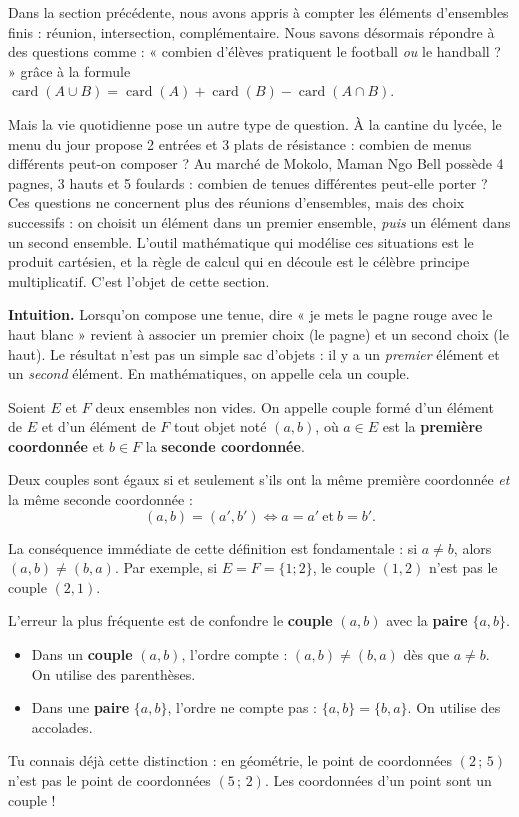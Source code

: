 \documentclass[11pt]{article}
\newcommand{\cle}[1]{{\popxbold\color{popdark}#1}}
\newcounter{popsec}
\newcounter{popsub}
\newcommand{\courssub}[1]{%
  \stepcounter{popsub}%
  \par\vspace{9pt}\noindent{\popxbold\fontsize{11.5}{13}\selectfont\color{popink}{\color{poporange}\thepopsec.\thepopsub}\hspace{6pt}#1}\par\nopagebreak\vspace{4pt}
}
\begin{document}
Dans la section précédente, nous avons appris à compter les éléments d'ensembles finis : réunion, intersection, complémentaire. Nous savons désormais répondre à des questions comme : « combien d'élèves pratiquent le football \emph{ou} le handball ? » grâce à la formule $\operatorname{card}(A\cup B)=\operatorname{card}(A)+\operatorname{card}(B)-\operatorname{card}(A\cap B)$.

Mais la vie quotidienne pose un autre type de question. À la cantine du lycée, le menu du jour propose 2 entrées et 3 plats de résistance : combien de menus différents peut-on composer ? Au marché de Mokolo, Maman Ngo Bell possède 4 pagnes, 3 hauts et 5 foulards : combien de tenues différentes peut-elle porter ? Ces questions ne concernent plus des réunions d'ensembles, mais des \cle{choix successifs} : on choisit un élément dans un premier ensemble, \emph{puis} un élément dans un second ensemble. L'outil mathématique qui modélise ces situations est le \cle{produit cartésien}, et la règle de calcul qui en découle est le célèbre \cle{principe multiplicatif}. C'est l'objet de cette section.

\courssub{Couple d'éléments : l'ordre compte}

\textbf{Intuition.} Lorsqu'on compose une tenue, dire « je mets le pagne rouge avec le haut blanc » revient à associer un premier choix (le pagne) et un second choix (le haut). Le résultat n'est pas un simple sac d'objets : il y a un \emph{premier} élément et un \emph{second} élément. En mathématiques, on appelle cela un \cle{couple}.

\begin{definition}
Soient $E$ et $F$ deux ensembles non vides. On appelle \cle{couple} formé d'un élément de $E$ et d'un élément de $F$ tout objet noté $(a,b)$, où $a\in E$ est la \textbf{première coordonnée} et $b\in F$ la \textbf{seconde coordonnée}.

Deux couples sont égaux si et seulement s'ils ont la même première coordonnée \emph{et} la même seconde coordonnée :
\[ (a,b)=(a',b') \iff a=a' \ \text{et}\ b=b'. \]
\end{definition}

La conséquence immédiate de cette définition est fondamentale : si $a\neq b$, alors $(a,b)\neq(b,a)$. Par exemple, si $E=F=\{1;2\}$, le couple $(1,2)$ n'est pas le couple $(2,1)$.

\begin{attention}
L'erreur la plus fréquente est de confondre le \textbf{couple} $(a,b)$ avec la \textbf{paire} $\{a,b\}$.
\begin{itemize}
\item Dans un \textbf{couple} $(a,b)$, l'\cle{ordre compte} : $(a,b)\neq(b,a)$ dès que $a\neq b$. On utilise des parenthèses.
\item Dans une \textbf{paire} $\{a,b\}$, l'ordre ne compte pas : $\{a,b\}=\{b,a\}$. On utilise des accolades.
\end{itemize}
Tu connais déjà cette distinction : en géométrie, le point de coordonnées $(2\,;\,5)$ n'est pas le point de coordonnées $(5\,;\,2)$. Les coordonnées d'un point sont un couple !
\end{attention}
\end{document}
